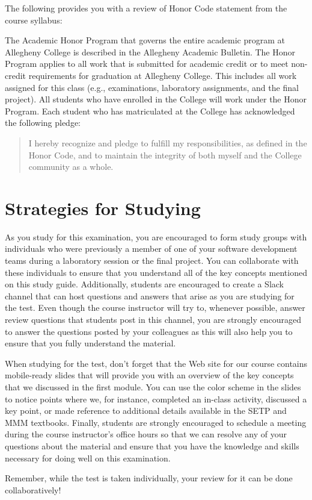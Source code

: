 \noindent The following provides you with a review of Honor Code statement from the course syllabus:

The Academic Honor Program that governs the entire academic program at Allegheny College is described in the Allegheny
Academic Bulletin.  The Honor Program applies to all work that is submitted for academic credit or to meet non-credit
requirements for graduation at Allegheny College.  This includes all work assigned for this class (e.g., examinations,
laboratory assignments, and the final project).  All students who have enrolled in the College will work under the Honor
Program.  Each student who has matriculated at the College has acknowledged the following pledge:

\vspace*{-.11in}
\begin{quote}
  I hereby recognize and pledge to fulfill my responsibilities, as defined in the Honor Code, and to maintain the
  integrity of both myself and the College community as a whole.
\end{quote}
\vspace*{-.11in}

\vspace*{-.2in}
\section*{Strategies for Studying}
\vspace*{-.05in}

As you study for this examination, you are encouraged to form study groups with individuals who were previously a member
of one of your software development teams during a laboratory session or the final project. You can collaborate with
these individuals to ensure that you understand all of the key concepts mentioned on this study guide. Additionally,
students are encouraged to create a Slack channel that can host questions and answers that arise as you are studying for
the test.  Even though the course instructor will try to, whenever possible, answer review questions that students post
in this channel, you are strongly encouraged to answer the questions posted by your colleagues as this will also help
you to ensure that you fully understand the material.

When studying for the test, don't forget that the Web site for our course contains mobile-ready slides that will provide
you with an overview of the key concepts that we discussed in the first module. You can use the color scheme in the
slides to notice points where we, for instance, completed an in-class activity, discussed a key point, or made reference
to additional details available in the SETP and MMM textbooks. Finally, students are strongly encouraged to schedule a
meeting during the course instructor's office hours so that we can resolve any of your questions about the material and
ensure that you have the knowledge and skills necessary for doing well on this examination.

Remember, while the test is taken individually, your review for it can be done collaboratively!


